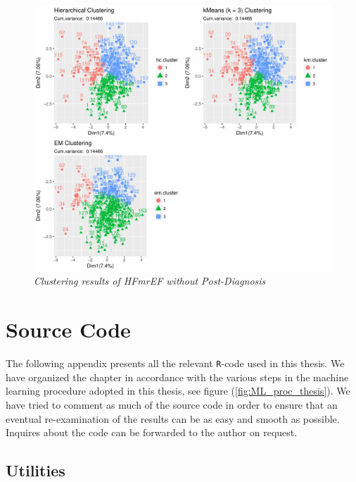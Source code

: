 \documentclass[../thesis.tex]{subfiles}
\begin{document}
\newpage

\begin{figure}[h!]
    \centering
    \hspace*{-1cm}\includegraphics[width=1.1\textwidth]{doc/thesis/images/ClustmrNoPhy.pdf}
    \caption[Clustering results of HFmrEF without Post-Diagnosis]{\textit{Clustering results of HFmrEF \textit{without} Post-Diagnosis}}
    \label{fig:clust_results_without_post_mr}
\end{figure}

\chapter{Source Code}
\label{chap:souce_code}

\noindent The following appendix presents all the relevant \texttt{R}-code used in this thesis. We have organized the chapter in accordance with the various steps in the machine learning procedure adopted in this thesis, see figure (\ref{fig:ML_proc_thesis}). We have tried to comment as much of the source code in order to ensure that an eventual re-examination of the results can be as easy and smooth as possible. Inquires about the code can be forwarded to the author on request.

\section{Utilities}
\label{sec:utilities}
\end{document}
